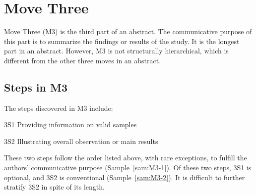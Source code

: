 \documentclass[a4paper]{ctexbook}
\begin{document}
\chapter{Move Three}\label{chapter5}

Move Three (M3) is the third part of an abstract. The communicative purpose of this part is to summarize the findings or results of the study. It is the longest part in an abstract. However, M3 is not structurally hierarchical, which is different from the other three moves in an abstract.

\section{Steps in M3}

The steps discovered in M3 include:

3S1 Providing information on valid samples

3S2 Illustrating overall observation or main results 

These two steps follow the order listed above, with rare exceptions, to fulfill the authors' communicative purpose (Sample~\ref{sam:M3-1}). Of these two steps, 3S1 is optional, and 3S2 is conventional (Sample~\ref{sam:M3-2}). It is difficult to further stratify 3S2 in spite of its length.
\end{document}
